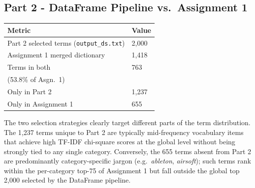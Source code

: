 \documentclass[11pt,a4paper]{extarticle}
\begin{document}
\subsection{Part 2 - DataFrame Pipeline vs.\ Assignment 1}
\begin{center}
\begin{tabular}{ll}
\toprule
\textbf{Metric} & \textbf{Value} \\
\midrule
Part 2 selected terms (\texttt{output\_ds.txt}) & 2,000 \\
Assignment 1 merged dictionary                  & 1,418 \\
Terms in both                                   & 763 \\(53.8\% of Asgn.\ 1) \\
Only in Part 2                                  & 1,237 \\
Only in Assignment 1                            & 655 \\
\bottomrule
\end{tabular}
\end{center}

The two selection strategies clearly target different parts of the term distribution. The 1{,}237 terms unique to Part 2 are typically mid-frequency vocabulary items that achieve high TF-IDF chi-square scores at the global level without being strongly tied to any single category. Conversely, the 655 terms absent from Part 2 are predominantly category-specific jargon (e.g.\ \textit{ableton}, \textit{airsoft}); such terms rank within the per-category top-75 of Assignment 1 but fall outside the global top 2{,}000 selected by the DataFrame pipeline.
\end{document}
